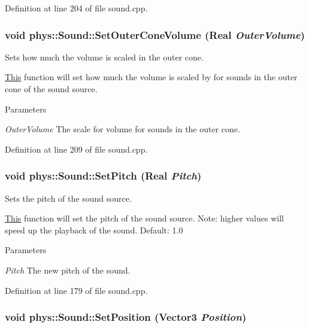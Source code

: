 Definition at line 204 of file sound.cpp.

\hypertarget{classphys_1_1Sound_a55b0eadd492fc1a5fbae9848f5682ac9}{
\subsubsection[{SetOuterConeVolume}]{\setlength{\rightskip}{0pt plus 5cm}void phys::Sound::SetOuterConeVolume ({\bf Real} {\em OuterVolume})}}
\label{dc/d2f/classphys_1_1Sound_a55b0eadd492fc1a5fbae9848f5682ac9}


Sets how much the volume is scaled in the outer cone. 

\hyperlink{structThis}{This} function will set how much the volume is scaled by for sounds in the outer cone of the sound source. 
\begin{DoxyParams}{Parameters}
\item[{\em OuterVolume}]The scale for volume for sounds in the outer cone. \end{DoxyParams}


Definition at line 209 of file sound.cpp.

\hypertarget{classphys_1_1Sound_a4c7eac57c162f264d8c0868c4f360aab}{
\subsubsection[{SetPitch}]{\setlength{\rightskip}{0pt plus 5cm}void phys::Sound::SetPitch ({\bf Real} {\em Pitch})}}
\label{dc/d2f/classphys_1_1Sound_a4c7eac57c162f264d8c0868c4f360aab}


Sets the pitch of the sound source. 

\hyperlink{structThis}{This} function will set the pitch of the sound source. Note: higher values will speed up the playback of the sound. Default: 1.0 
\begin{DoxyParams}{Parameters}
\item[{\em Pitch}]The new pitch of the sound. \end{DoxyParams}


Definition at line 179 of file sound.cpp.

\hypertarget{classphys_1_1Sound_a245bc4d760bcf30e9520aee00cf40c61}{
\subsubsection[{SetPosition}]{\setlength{\rightskip}{0pt plus 5cm}void phys::Sound::SetPosition ({\bf Vector3} {\em Position})}}
\label{dc/d2f/classphys_1_1Sound_a245bc4d760bcf30e9520aee00cf40c61}


